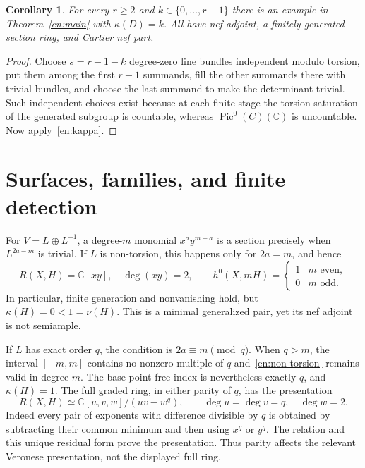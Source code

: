 \documentclass[12pt]{amsart}
\newtheorem{cor}[thm]{Corollary}
\theoremstyle{definition}
\theoremstyle{remark}
\numberwithin{equation}{section}
\newcommand{\C}{\mathbb{C}}
\DeclareMathOperator{\Pic}{Pic}
\begin{document}
\begin{cor}\label{en:allkappa}
For every $r\geq2$ and $k\in\{0,\ldots,r-1\}$ there is an example in Theorem~\ref{en:main} with $\kappa(D)=k$. All have nef adjoint, a finitely generated section ring, and Cartier nef part.
\end{cor}
\begin{proof}
Choose $s=r-1-k$ degree-zero line bundles independent modulo torsion, put them among the first $r-1$ summands, fill the other summands there with trivial bundles, and choose the last summand to make the determinant trivial. Such independent choices exist because at each finite stage the torsion saturation of the generated subgroup is countable, whereas $\Pic^0(C)(\C)$ is uncountable. Now apply~\eqref{en:kappa}.
\end{proof}

\section{Surfaces, families, and finite detection}\label{en:surface}
For $V=L\oplus L^{-1}$, a degree-$m$ monomial $x^ay^{m-a}$ is a section precisely when $L^{2a-m}$ is trivial. If $L$ is non-torsion, this happens only for $2a=m$, and hence
\begin{equation}\label{en:non-torsion}
 R(X,H)=\C[xy],\quad\deg(xy)=2,\qquad
 h^0(X,mH)=\begin{cases}1&m\text{ even},\\0&m\text{ odd}.\end{cases}
\end{equation}
In particular, finite generation and nonvanishing hold, but $\kappa(H)=0<1=\nu(H)$. This is a minimal generalized pair, yet its nef adjoint is not semiample.

If $L$ has exact order $q$, the condition is $2a\equiv m\pmod q$. When $q>m$, the interval $[-m,m]$ contains no nonzero multiple of $q$ and~\eqref{en:non-torsion} remains valid in degree $m$. The base-point-free index is nevertheless exactly $q$, and $\kappa(H)=1$. The full graded ring, in either parity of $q$, has the presentation
\begin{equation}\label{en:surface-ring}
 R(X,H)\simeq\C[u,v,w]/(uv-w^q),\qquad
 \deg u=\deg v=q,\quad\deg w=2.
\end{equation}
Indeed every pair of exponents with difference divisible by $q$ is obtained by subtracting their common minimum and then using $x^q$ or $y^q$. The relation and this unique residual form prove the presentation. Thus parity affects the relevant Veronese presentation, not the displayed full ring.
\end{document}
